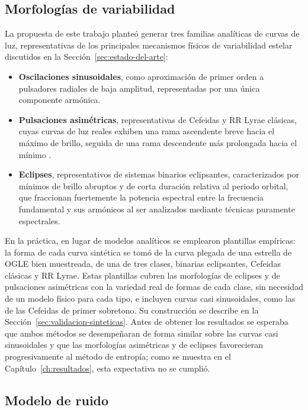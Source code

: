 \documentclass[12pt,letterpaper,oneside]{book}
\begin{document}
\subsection{Morfolog\'ias de variabilidad}

La propuesta de este trabajo plante\'o generar tres familias anal\'iticas de curvas de luz, representativas de los principales mecanismos f\'isicos de variabilidad estelar discutidos en la Secci\'on~\ref{sec:estado-del-arte}:

\begin{itemize}
	\item \textbf{Oscilaciones sinusoidales}, como aproximaci\'on de primer orden a pulsadores radiales de baja amplitud, representadas por una \'unica componente arm\'onica.
	\item \textbf{Pulsaciones asim\'etricas}, representativas de Cefeidas y RR Lyrae cl\'asicas, cuyas curvas de luz reales exhiben una rama ascendente breve hacia el m\'aximo de brillo, seguida de una rama descendente m\'as prolongada hacia el m\'inimo \citep{Karttunen2016,Carroll2017}.
	\item \textbf{Eclipses}, representativos de sistemas binarios eclipsantes, caracterizados por m\'inimos de brillo abruptos y de corta duraci\'on relativa al periodo orbital, que fraccionan fuertemente la potencia espectral entre la frecuencia fundamental y sus arm\'onicos al ser analizados mediante t\'ecnicas puramente espectrales.
\end{itemize}

En la pr\'actica, en lugar de modelos anal\'iticos se emplearon plantillas emp\'iricas: la forma de cada curva sint\'etica se tom\'o de la curva plegada de una estrella de OGLE bien muestreada, de una de tres clases, binarias eclipsantes, Cefeidas cl\'asicas y RR Lyrae. Estas plantillas cubren las morfolog\'ias de eclipses y de pulsaciones asim\'etricas con la variedad real de formas de cada clase, sin necesidad de un modelo f\'isico para cada tipo, e incluyen curvas casi sinusoidales, como las de las Cefeidas de primer sobretono. Su construcci\'on se describe en la Secci\'on~\ref{sec:validacion-sinteticas}. Antes de obtener los resultados se esperaba que ambos m\'etodos se desempe\~naran de forma similar sobre las curvas casi sinusoidales y que las morfolog\'ias asim\'etricas y de eclipses favorecieran progresivamente al m\'etodo de entrop\'ia; como se muestra en el Cap\'itulo~\ref{ch:resultados}, esta expectativa no se cumpli\'o.

\subsection{Modelo de ruido}
\end{document}
